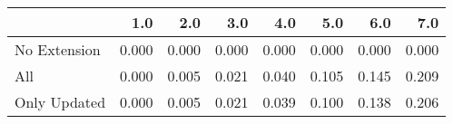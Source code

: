 \begin{tabular}{lrrrrrrr}
\toprule
{} &   1.0 &   2.0 &   3.0 &   4.0 &   5.0 &   6.0 &   7.0 \\
\midrule
No Extension & 0.000 & 0.000 & 0.000 & 0.000 & 0.000 & 0.000 & 0.000 \\
All          & 0.000 & 0.005 & 0.021 & 0.040 & 0.105 & 0.145 & 0.209 \\
Only Updated & 0.000 & 0.005 & 0.021 & 0.039 & 0.100 & 0.138 & 0.206 \\
\bottomrule
\end{tabular}

